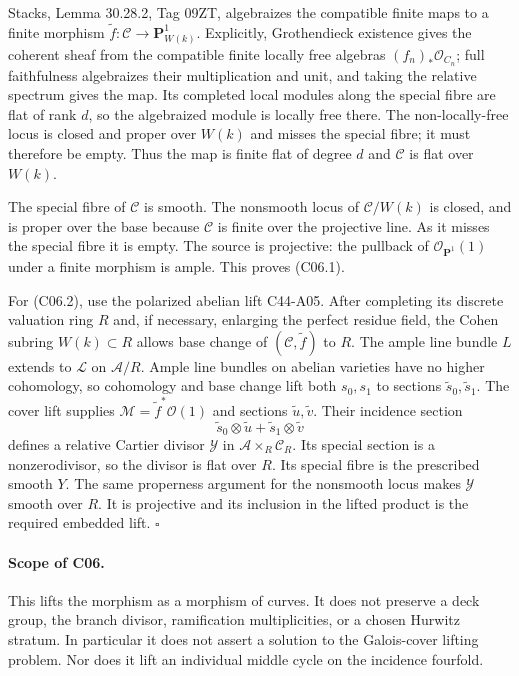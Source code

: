 \documentclass[11pt]{article}
\theoremstyle{remark}\newtheorem{remark}[theorem]{Remark}
\begin{document}
Stacks, Lemma 30.28.2, Tag 09ZT, algebraizes the compatible
finite maps to a finite morphism
$\widetilde f:\mathcal C\to\mathbf P^1_{W(k)}$.
Explicitly, Grothendieck existence gives the coherent sheaf
from the compatible finite locally free algebras
$(f_n)_*\mathcal O_{C_n}$; full faithfulness algebraizes
their multiplication and unit, and taking the relative
spectrum gives the map. Its completed local modules along
the special fibre are flat of rank $d$, so the algebraized
module is locally free there. The non-locally-free locus
is closed and proper over $W(k)$ and misses the special
fibre; it must therefore be empty. Thus the map is finite
flat of degree $d$ and $\mathcal C$ is flat over $W(k)$.

The special fibre of $\mathcal C$ is smooth. The nonsmooth
locus of $\mathcal C/W(k)$ is closed, and is proper over
the base because $\mathcal C$ is finite over the projective
line. As it misses the special fibre it is empty.
The source is projective: the pullback of
$\mathcal O_{\mathbf P^1}(1)$ under a finite morphism is
ample. This proves (C06.1).

For (C06.2), use the polarized abelian lift C44-A05.
After completing its discrete valuation ring $R$ and,
if necessary, enlarging the perfect residue field, the
Cohen subring $W(k)\subset R$ allows base change of
$(\mathcal C,\widetilde f)$ to $R$.
The ample line bundle $L$ extends to $\mathcal L$ on
$\mathcal A/R$. Ample line bundles on abelian varieties
have no higher cohomology, so cohomology and base change
lift both $s_0,s_1$ to sections $\widetilde s_0,\widetilde s_1$.
The cover lift supplies
$\mathcal M=\widetilde f^*\mathcal O(1)$ and sections
$\widetilde u,\widetilde v$.
Their incidence section
\[
                 \widetilde s_0\otimes\widetilde u+
                 \widetilde s_1\otimes\widetilde v
\]
defines a relative Cartier divisor $\mathcal Y$ in
$\mathcal A\times_R\mathcal C_R$. Its special section is a
nonzerodivisor, so the divisor is flat over $R$.
Its special fibre is the prescribed smooth $Y$.
The same properness argument for the nonsmooth locus
makes $\mathcal Y$ smooth over $R$. It is projective and
its inclusion in the lifted product is the required
embedded lift. \hfill$\square$

\paragraph{Scope of C06.}
This lifts the morphism as a morphism of curves.
It does not preserve a deck group, the branch divisor,
ramification multiplicities, or a chosen Hurwitz stratum.
In particular it does not assert a solution to the
Galois-cover lifting problem. Nor does it lift an
individual middle cycle on the incidence fourfold.
\end{document}
